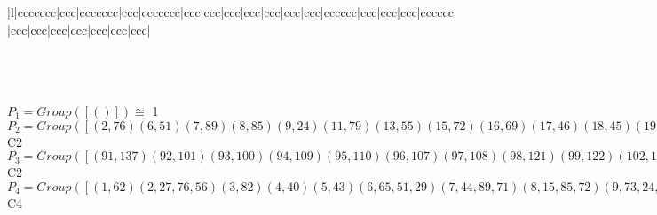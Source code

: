 \documentclass[varwidth=\maxdimen,border=10]{standalone}
\begin{document}
\begin{tabular}
\begin{array}{|l|ccccccc|ccc|ccccccc|ccc|ccccccc|ccc|ccc|ccc|ccc|ccc|ccc|ccc|cccccc|ccc|ccc|ccc|cccccc|ccc|ccc|ccc|ccc|ccc|ccc|ccc|}
\end{array}\)\\
\ \\
\ \\
$P_1 = Group( [ () ] )\cong$ 1\ \\
$P_2 = Group( [ (  2, 76)(  6, 51)(  7, 89)(  8, 85)(  9, 24)( 11, 79)( 13, 55)( 15, 72)( 16, 69)( 17, 46)( 18, 45)( 19, 39)( 20, 31)( 21, 68)( 22, 52)( 26, 74)( 27, 56)( 28, 59)( 29, 65)( 30, 88)( 32, 41)( 34, 50)( 35, 47)( 36, 61)( 37, 81)( 38, 75)( 44, 71)( 48, 87)( 49, 86)( 54, 90)( 57, 63)( 58, 78)( 60, 66)( 70, 84)( 73, 83)( 77, 80)( 91,122)( 92,101)( 93,164)( 94,117)( 95,153)( 96,120)( 97,108)( 99,137)(100,170)(102,141)(103,107)(104,125)(105,158)(106,130)(109,118)(110,160)(112,157)(113,144)(114,139)(115,132)(119,142)(123,148)(124,156)(126,138)(127,151)(128,149)(129,134)(131,155)(135,161)(136,140)(143,162)(145,150)(152,167)(154,159)(163,165)(166,169) ] )\cong$ C2\ \\
$P_3 = Group( [ ( 91,137)( 92,101)( 93,100)( 94,109)( 95,110)( 96,107)( 97,108)( 98,121)( 99,122)(102,119)(103,120)(104,138)(105,106)(111,133)(112,134)(113,135)(114,136)(115,148)(116,147)(117,118)(123,132)(124,131)(125,126)(127,128)(129,157)(130,158)(139,140)(141,142)(143,162)(144,161)(145,167)(146,168)(149,151)(150,152)(153,160)(154,159)(155,156)(163,169)(164,170)(165,166) ] )\cong$ C2\ \\
$P_4 = Group( [ (  1, 62)(  2, 27, 76, 56)(  3, 82)(  4, 40)(  5, 43)(  6, 65, 51, 29)(  7, 44, 89, 71)(  8, 15, 85, 72)(  9, 73, 24, 83)( 10, 67)( 11, 28, 79, 59)( 12, 64)( 13, 47, 55, 35)( 14, 25)( 16, 26, 69, 74)( 17, 20, 46, 31)( 18, 48, 45, 87)( 19, 49, 39, 86)( 21, 34, 68, 50)( 22, 70, 52, 84)( 23, 42)( 30, 61, 88, 36)( 32, 54, 41, 90)( 33, 53)( 37, 57, 81, 63)( 38, 60, 75, 66)( 58, 77, 78, 80)( 91,149,122,128)( 92,162,101,143)( 93,140,164,136)( 94, 96,117,120)( 95,102,153,141)( 97,154,108,159)( 98,146)( 99,127,137,151)(100,139,170,114)(103,109,107,118)(104,145,125,150)(105,129,158,134)(106,157,130,112)(110,119,160,142)(113,163,144,165)(115,155,132,131)(116,147)(121,168)(123,124,148,156)(126,152,138,167)(135,169,161,166), (  2, 76)(  6, 51)(  7, 89)(  8, 85)(  9, 24)( 11, 79)( 13, 55)( 15, 72)( 16, 69)( 17, 46)( 18, 45)( 19, 39)( 20, 31)( 21, 68)( 22, 52)( 26, 74)( 27, 56)( 28, 59)( 29, 65)( 30, 88)( 32, 41)( 34, 50)( 35, 47)( 36, 61)( 37, 81)( 38, 75)( 44, 71)( 48, 87)( 49, 86)( 54, 90)( 57, 63)( 58, 78)( 60, 66)( 70, 84)( 73, 83)( 77, 80)( 91,122)( 92,101)( 93,164)( 94,117)( 95,153)( 96,120)( 97,108)( 99,137)(100,170)(102,141)(103,107)(104,125)(105,158)(106,130)(109,118)(110,160)(112,157)(113,144)(114,139)(115,132)(119,142)(123,148)(124,156)(126,138)(127,151)(128,149)(129,134)(131,155)(135,161)(136,140)(143,162)(145,150)(152,167)(154,159)(163,165)(166,169) ] )\cong$ C4\ \\

\end{tabular}
\end{document}
